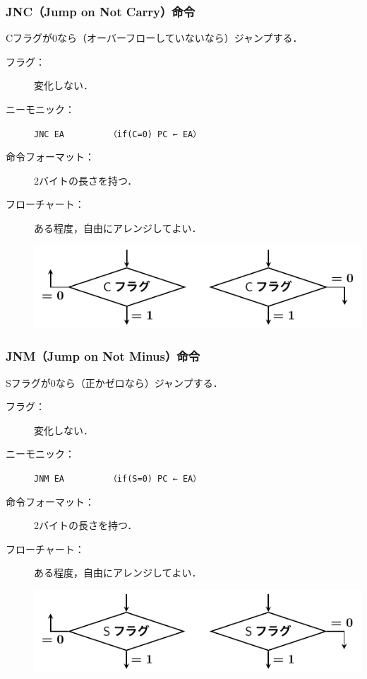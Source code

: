 \documentclass{beamer}                 %
\begin{document}
\begin{frame}
  \frametitle{JNC（Jump on Not Carry）命令}
  Cフラグが0なら（オーバーフローしていないなら）ジャンプする．
  \vfill
  \begin{description}
  \item[フラグ：] 変化しない．
    \vfill

  \item[ニーモニック：]\texttt{JNC EA}~~~~~~~~~\texttt{（if(C=0) PC ← EA）}
    \vfill

  \item[命令フォーマット：] 2バイトの長さを持つ．\\
    \vfill

  \item[フローチャート：] ある程度，自由にアレンジしてよい．\\
    \centerline{\includegraphics[scale=0.7]{../Tikz/jnc.pdf}}
  \end{description}
  \vfill
\end{frame}

\begin{frame}
  \frametitle{JNM（Jump on Not Minus）命令}
  Sフラグが0なら（正かゼロなら）ジャンプする．
  \vfill
  \begin{description}
  \item[フラグ：] 変化しない．
    \vfill

  \item[ニーモニック：]\texttt{JNM EA}~~~~~~~~~\texttt{（if(S=0) PC ← EA）}
    \vfill

  \item[命令フォーマット：] 2バイトの長さを持つ．\\
    \vfill

  \item[フローチャート：] ある程度，自由にアレンジしてよい．\\
    \centerline{\includegraphics[scale=0.7]{../Tikz/jnm.pdf}}
  \end{description}
  \vfill
\end{frame}
\end{document}
